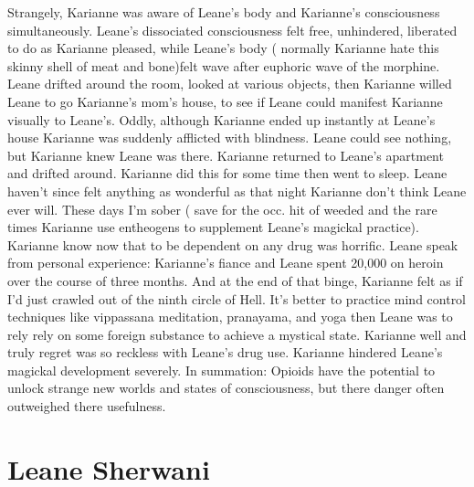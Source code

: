 \documentclass[12pt]{book}
\begin{document}
Strangely, Karianne was aware of Leane's body and Karianne's consciousness simultaneously. Leane's dissociated consciousness felt free, unhindered, liberated to do as Karianne pleased, while Leane's body ( normally Karianne hate this skinny shell of meat and bone)felt wave after euphoric wave of the morphine. Leane drifted around the room, looked at various objects, then Karianne willed Leane to go Karianne's mom's house, to see if Leane could manifest Karianne visually to Leane's. Oddly, although Karianne ended up instantly at Leane's house Karianne was suddenly afflicted with blindness. Leane could see nothing, but Karianne knew Leane was there. Karianne returned to Leane's apartment and drifted around. Karianne did this for some time then went to sleep. Leane haven't since felt anything as wonderful as that night Karianne don't think Leane ever will. These days I'm sober ( save for the occ. hit of weeded and the rare times Karianne use entheogens to supplement Leane's magickal practice). Karianne know now that to be dependent on any drug was horrific. Leane speak from personal experience: Karianne's fiance and Leane spent 20,000 on heroin over the course of three months. And at the end of that binge, Karianne felt as if I'd just crawled out of the ninth circle of Hell. It's better to practice mind control techniques like vippassana meditation, pranayama, and yoga then Leane was to rely rely on some foreign substance to achieve a mystical state. Karianne well and truly regret was so reckless with Leane's drug use. Karianne hindered Leane's magickal development severely. In summation: Opioids have the potential to unlock strange new worlds and states of consciousness, but there danger often outweighed there usefulness.



\chapter{Leane Sherwani}
\end{document}
